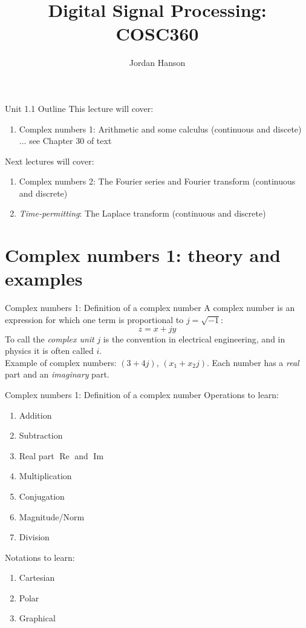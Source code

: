 \documentclass{beamer}
\title{Digital Signal Processing: COSC360}
\author{Jordan Hanson}
\institute{Whittier College Department of Physics and Astronomy}
\begin{document}
\maketitle

\begin{frame}{Unit 1.1 Outline}
This lecture will cover:
\begin{enumerate}
\item \alert{Complex numbers 1: Arithmetic and some calculus (continuous and discete) ... see Chapter 30 of text}
\end{enumerate}
Next lectures will cover:
\begin{enumerate}
\item Complex numbers 2: The Fourier series and Fourier transform (continuous and discrete)
\item \textit{Time-permitting}: The Laplace transform (continuous and discrete)
\end{enumerate}
\end{frame}

\section{Complex numbers 1: theory and examples}

\begin{frame}{Complex numbers 1: Definition of a complex number}
A \alert{complex number} is an expression for which one term is proportional to $j = \sqrt{-1}$:
\begin{equation}
z = x + jy
\end{equation}
To call the \textit{complex unit} $j$ is the convention in electrical engineering, and in physics it is often called $i$. \\ \vspace{0.5cm}
Example of complex numbers: $(3+4j)$, $(x_1 + x_2 j)$.  Each number has a \textit{real} part and an \textit{imaginary} part.
\end{frame}

\begin{frame}{Complex numbers 1: Definition of a complex number}
Operations to learn:
\begin{enumerate}
\item Addition
\item Subtraction
\item Real part $\operatorname{Re}$ and $\operatorname{Im}$
\item Multiplication
\item Conjugation
\item Magnitude/Norm
\item Division
\end{enumerate}
Notations to learn:
\begin{enumerate}
\item Cartesian
\item Polar
\item Graphical
\end{enumerate}
\end{frame}
\end{document}
